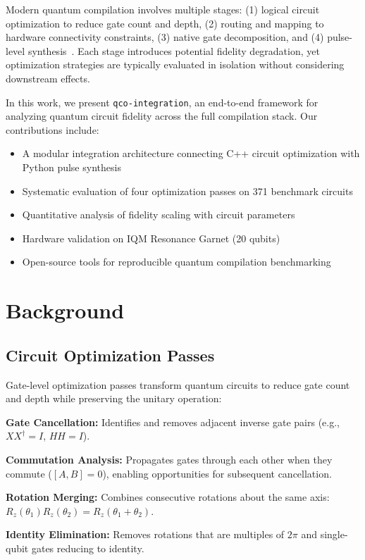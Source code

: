 \documentclass[journal]{IEEEtran}
\begin{document}
Modern quantum compilation involves multiple stages: (1) logical circuit optimization to reduce gate count and depth, (2) routing and mapping to hardware connectivity constraints, (3) native gate decomposition, and (4) pulse-level synthesis~\cite{shi2019optimized}. Each stage introduces potential fidelity degradation, yet optimization strategies are typically evaluated in isolation without considering downstream effects.

In this work, we present \texttt{qco-integration}, an end-to-end framework for analyzing quantum circuit fidelity across the full compilation stack. Our contributions include:
\begin{itemize}
    \item A modular integration architecture connecting C++ circuit optimization with Python pulse synthesis
    \item Systematic evaluation of four optimization passes on 371 benchmark circuits
    \item Quantitative analysis of fidelity scaling with circuit parameters
    \item Hardware validation on IQM Resonance Garnet (20 qubits)
    \item Open-source tools for reproducible quantum compilation benchmarking
\end{itemize}

\section{Background}

\subsection{Circuit Optimization Passes}

Gate-level optimization passes transform quantum circuits to reduce gate count and depth while preserving the unitary operation:

\textbf{Gate Cancellation:} Identifies and removes adjacent inverse gate pairs (e.g., $XX^{\dagger} = I$, $HH = I$).

\textbf{Commutation Analysis:} Propagates gates through each other when they commute ($[A, B] = 0$), enabling opportunities for subsequent cancellation.

\textbf{Rotation Merging:} Combines consecutive rotations about the same axis: $R_z(\theta_1)R_z(\theta_2) = R_z(\theta_1 + \theta_2)$.

\textbf{Identity Elimination:} Removes rotations that are multiples of $2\pi$ and single-qubit gates reducing to identity.
\end{document}
